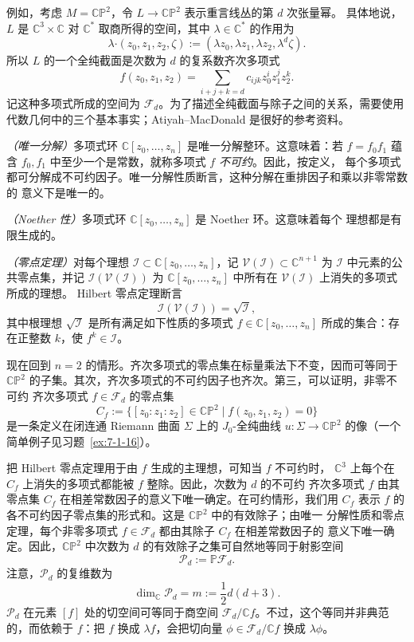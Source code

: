 例如，考虑 $M=\mathbb{CP}^2$，令 $L\to\mathbb{CP}^2$ 表示重言线丛的第 $d$ 次张量幂。
具体地说，$L$ 是 $\mathbb C^3\times\mathbb C$ 对 $\mathbb C^*$ 取商所得的空间，其中
$\lambda\in\mathbb C^*$ 的作用为
\[
  \lambda\mathbin{\boldsymbol\cdot}(z_0,z_1,z_2,\zeta)
  :=(\lambda z_0,\lambda z_1,\lambda z_2,\lambda^d\zeta).
\]
所以 $L$ 的一个全纯截面是次数为 $d$ 的复系数齐次多项式
\[
  f(z_0,z_1,z_2)
  =\sum_{i+j+k=d}c_{ijk}z_0^iz_1^jz_2^k.
\]
记这种多项式所成的空间为 $\mathcal F_d$。为了描述全纯截面与除子之间的关系，需要使用
代数几何中的三个基本事实；Atiyah--MacDonald  是很好的参考资料。

\emph{（唯一分解）}多项式环 $\mathbb C[z_0,\ldots,z_n]$ 是唯一分解整环。这意味着：若
$f=f_0f_1$ 蕴含 $f_0,f_1$ 中至少一个是常数，就称多项式 $f$ \emph{不可约}。因此，按定义，
每个多项式都可分解成不可约因子。唯一分解性质断言，这种分解在重排因子和乘以非零常数的
意义下是唯一的。

\emph{（Noether 性）}多项式环 $\mathbb C[z_0,\ldots,z_n]$ 是 Noether 环。这意味着每个
理想都是有限生成的。

\emph{（零点定理）}对每个理想 $\mathcal I\subset\mathbb C[z_0,\ldots,z_n]$，记
$\mathcal V(\mathcal I)\subset\mathbb C^{n+1}$ 为 $\mathcal I$ 中元素的公共零点集，并记
$\mathcal I(\mathcal V(\mathcal I))$ 为
$\mathbb C[z_0,\ldots,z_n]$ 中所有在 $\mathcal V(\mathcal I)$ 上消失的多项式所成的理想。
Hilbert 零点定理断言
\[
  \mathcal I(\mathcal V(\mathcal I))=\sqrt{\mathcal I},
\]
其中根理想 $\sqrt{\mathcal I}$ 是所有满足如下性质的多项式
$f\in\mathbb C[z_0,\ldots,z_n]$ 所成的集合：存在正整数 $k$，使 $f^k\in\mathcal I$。

现在回到 $n=2$ 的情形。齐次多项式的零点集在标量乘法下不变，因而可等同于
$\mathbb{CP}^2$ 的子集。其次，齐次多项式的不可约因子也齐次。第三，可以证明，非零不可约
齐次多项式 $f\in\mathcal F_d$ 的零点集
\[
  C_f:=\bigl\{[z_0:z_1:z_2]\in\mathbb{CP}^2\mid
  f(z_0,z_1,z_2)=0\bigr\}
\]
是一条定义在闭连通 Riemann 曲面 $\Sigma$ 上的 $J_0$-全纯曲线
$u:\Sigma\to\mathbb{CP}^2$ 的像（一个简单例子见习题~\ref{ex:7-1-16}）。

把 Hilbert 零点定理用于由 $f$ 生成的主理想，可知当 $f$ 不可约时，
$\mathbb C^3$ 上每个在 $C_f$ 上消失的多项式都能被 $f$ 整除。因此，次数为 $d$ 的不可约
齐次多项式 $f$ 由其零点集 $C_f$ 在相差常数因子的意义下唯一确定。在可约情形，我们用
$C_f$ 表示 $f$ 的各不可约因子零点集的形式和。这是 $\mathbb{CP}^2$ 中的有效除子；由唯一
分解性质和零点定理，每个非零多项式 $f\in\mathcal F_d$ 都由其除子 $C_f$ 在相差常数因子的
意义下唯一确定。因此，$\mathbb{CP}^2$ 中次数为 $d$ 的有效除子之集可自然地等同于射影空间
\[
  \mathcal P_d:=\mathbb P\mathcal F_d.
\]
注意，$\mathcal P_d$ 的复维数为
\[
  \dim_{\mathbb C}\mathcal P_d=m:=\frac12d(d+3).
\]
$\mathcal P_d$ 在元素 $[f]$ 处的切空间可等同于商空间
$\mathcal F_d/\mathbb C f$。不过，这个等同并非典范的，而依赖于 $f$：把 $f$ 换成
$\lambda f$，会把切向量 $\phi\in\mathcal F_d/\mathbb C f$ 换成 $\lambda\phi$。

